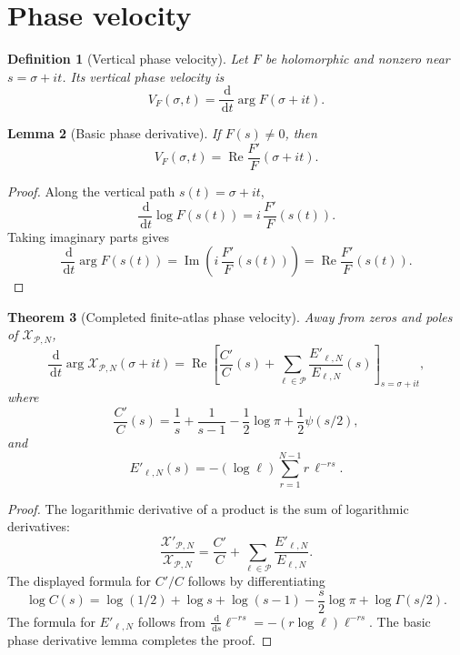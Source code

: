 \documentclass[11pt]{article}
\newtheorem{definition}{Definition}[section]
\newtheorem{theorem}[definition]{Theorem}
\newtheorem{lemma}[definition]{Lemma}
\newcommand{\Pset}{\mathcal P}
\newcommand{\X}{\mathcal X}
\newcommand{\dd}{\,\mathrm d}
\DeclareMathOperator{\Ree}{Re}
\DeclareMathOperator{\Imm}{Im}
\begin{document}
\section{Phase velocity}

\begin{definition}[Vertical phase velocity]
Let \(F\) be holomorphic and nonzero near \(s=\sigma+it\).  Its vertical phase
velocity is
\[
        V_F(\sigma,t)
        =
        \frac{\dd}{\dd t}\arg F(\sigma+it).
\]
\end{definition}

\begin{lemma}[Basic phase derivative]
If \(F(s)\ne0\), then
\[
        V_F(\sigma,t)
        =
        \Ree\frac{F'}{F}(\sigma+it).
\]
\end{lemma}

\begin{proof}
Along the vertical path \(s(t)=\sigma+it\),
\[
        \frac{\dd}{\dd t}\log F(s(t))
        =
        i\,\frac{F'}{F}(s(t)).
\]
Taking imaginary parts gives
\[
        \frac{\dd}{\dd t}\arg F(s(t))
        =
        \Imm\left(i\,\frac{F'}{F}(s(t))\right)
        =
        \Ree\frac{F'}{F}(s(t)).
\]
\end{proof}

\begin{theorem}[Completed finite-atlas phase velocity]
Away from zeros and poles of \(\X_{\Pset,N}\),
\[
        \frac{\dd}{\dd t}\arg \X_{\Pset,N}(\sigma+it)
        =
        \Ree\left[
        \frac{C'}{C}(s)
        +
        \sum_{\ell\in\Pset}
        \frac{E'_{\ell,N}}{E_{\ell,N}}(s)
        \right]_{s=\sigma+it},
\]
where
\[
        \frac{C'}{C}(s)
        =
        \frac1s+\frac1{s-1}
        -\frac12\log\pi
        +\frac12\psi(s/2),
\]
and
\[
        E'_{\ell,N}(s)
        =
        -(\log\ell)
        \sum_{r=1}^{N-1}r\,\ell^{-rs}.
\]
\end{theorem}

\begin{proof}
The logarithmic derivative of a product is the sum of logarithmic
derivatives:
\[
        \frac{\X'_{\Pset,N}}{\X_{\Pset,N}}
        =
        \frac{C'}{C}
        +
        \sum_{\ell\in\Pset}
        \frac{E'_{\ell,N}}{E_{\ell,N}}.
\]
The displayed formula for \(C'/C\) follows by differentiating
\[
        \log C(s)=\log(1/2)+\log s+\log(s-1)-\frac{s}{2}\log\pi+\log\Gamma(s/2).
\]
The formula for \(E'_{\ell,N}\) follows from
\(\frac{\dd}{\dd s}\ell^{-rs}=-(r\log\ell)\ell^{-rs}\).
The basic phase derivative lemma completes the proof.
\end{proof}
\end{document}
